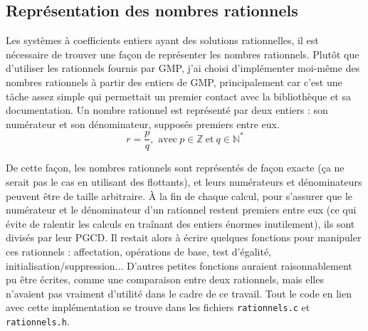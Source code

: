 \documentclass[french]{article}
\begin{document}
\subsection{Représentation des nombres rationnels}
Les systèmes à coefficients entiers ayant des solutions rationnelles, il est nécessaire de trouver une façon de représenter les nombres rationnels. Plutôt que d'utiliser les rationnels fournis par GMP, j'ai choisi d'implémenter moi-même des nombres rationnels à partir des entiers de GMP, principalement car c'est une tâche assez simple qui permettait un premier contact avec la bibliothèque et sa documentation.
Un nombre rationnel est représenté par deux entiers : son numérateur et son dénominateur, supposés premiers entre eux. 
$$r = \frac{p}{q}, \mbox{ avec} \ p \in \mathbb{Z}\ \mbox{et} \ q \in \mathbb{N}^*$$
\par
De cette façon, les nombres rationnels sont représentés de façon exacte (ça ne serait pas le cas en utilisant des flottants), et leurs numérateurs et dénominateurs peuvent être de taille arbitraire.
À la fin de chaque calcul, pour s'assurer que le numérateur et le dénominateur d'un rationnel restent premiers entre eux (ce qui évite de ralentir les calculs en traînant des entiers énormes inutilement), ils sont divisés par leur PGCD.
Il restait alors à écrire quelques fonctions pour manipuler ces rationnels : affectation, opérations de base, test d'égalité, initialisation/suppression... D'autres petites fonctions auraient raisonnablement pu être écrites, comme une comparaison entre deux rationnels, mais elles n'avaient pas vraiment d'utilité dans le cadre de ce travail.
Tout le code en lien avec cette implémentation se trouve dans les fichiers {\tt rationnels.c} et {\tt rationnels.h}.
\end{document}
